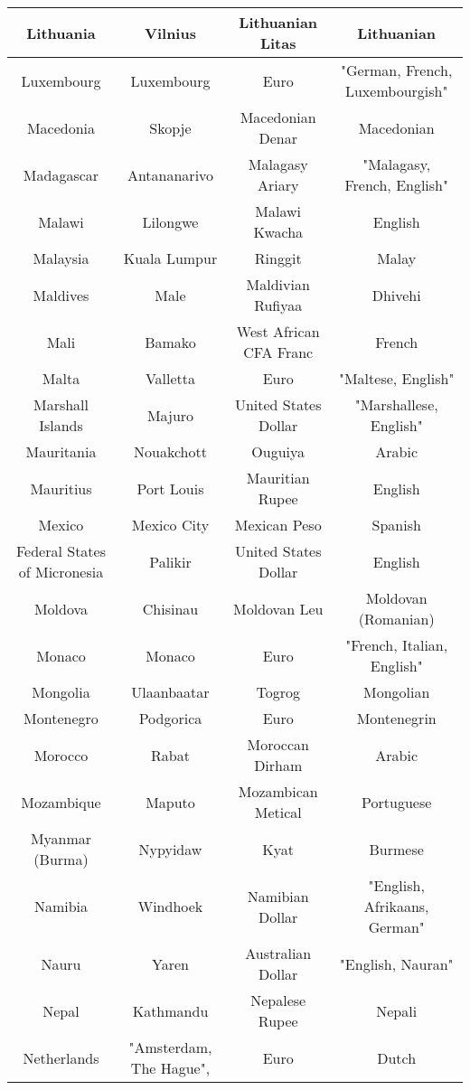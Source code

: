 \documentclass{article}
\begin{document}
\begin{center}
\begin{tabular} {||  c c c c  ||}
Lithuania & Vilnius & Lithuanian Litas & Lithuanian   \\ \hline 
Luxembourg & Luxembourg & Euro & "German, French, Luxembourgish"   \\ \hline 
Macedonia & Skopje & Macedonian Denar & Macedonian   \\ \hline 
Madagascar & Antananarivo & Malagasy Ariary & "Malagasy, French, English"   \\ \hline 
Malawi & Lilongwe & Malawi Kwacha & English   \\ \hline 
Malaysia & Kuala Lumpur & Ringgit & Malay   \\ \hline 
Maldives & Male & Maldivian Rufiyaa & Dhivehi   \\ \hline 
Mali & Bamako & West African CFA Franc & French   \\ \hline 
Malta & Valletta & Euro & "Maltese, English"   \\ \hline 
Marshall Islands & Majuro & United States Dollar & "Marshallese, English"   \\ \hline 
Mauritania & Nouakchott & Ouguiya & Arabic   \\ \hline 
Mauritius & Port Louis & Mauritian Rupee & English   \\ \hline 
Mexico & Mexico City & Mexican Peso & Spanish   \\ \hline 
Federal States of Micronesia & Palikir & United States Dollar & English   \\ \hline 
Moldova & Chisinau & Moldovan Leu & Moldovan (Romanian)   \\ \hline 
Monaco & Monaco & Euro & "French, Italian, English"   \\ \hline 
Mongolia & Ulaanbaatar & Togrog & Mongolian   \\ \hline 
Montenegro & Podgorica & Euro & Montenegrin   \\ \hline 
Morocco & Rabat & Moroccan Dirham & Arabic   \\ \hline 
Mozambique & Maputo & Mozambican Metical & Portuguese   \\ \hline 
Myanmar (Burma) & Nypyidaw & Kyat & Burmese   \\ \hline 
Namibia & Windhoek & Namibian Dollar & "English, Afrikaans, German"   \\ \hline 
Nauru & Yaren & Australian Dollar & "English, Nauran"   \\ \hline 
Nepal & Kathmandu & Nepalese Rupee & Nepali   \\ \hline 
Netherlands & "Amsterdam, The Hague", & Euro & Dutch   \\ \hline 

\end{tabular}
\end{center}
\end{document}
